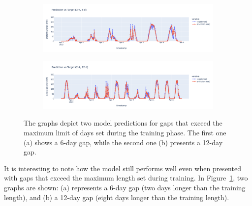 \begin{figure}[H]
	\centering
	\begin{subfigure}{\textwidth}
		\centering
		\includegraphics[width=.85\textwidth]{chapters/3_models/imgs/grrun/eval/grruneval6buco.png}
		\caption{}
	\end{subfigure}
	\begin{subfigure}{\textwidth}
		\centering
		\includegraphics[width=.85\textwidth]{chapters/3_models/imgs/grrun/eval/grruneval12buco.png}
		\caption{}
	\end{subfigure}
	\caption{The graphs depict two model predictions for gaps that exceed the maximum limit of days set during the training phase. The first one (a) shows a 6-day gap, while the second one (b) presents a 12-day gap.}
	\label{fig:grrunevalbucogrande}
\end{figure}

It is interesting to note how the model still performs well even
when presented with gaps that exceed the maximum length set
during training.
In Figure~\ref{fig:grrunevalbucogrande}, two graphs are shown:
(a) represents a 6-day gap (two days longer than the training length),
and (b) a 12-day gap (eight days longer than the training length).

